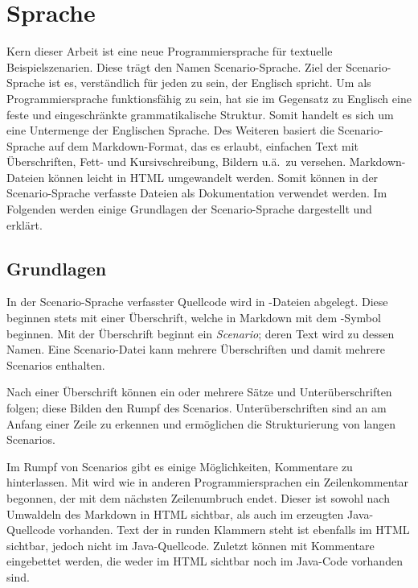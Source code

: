 \section{Sprache}\label{sec:language}

Kern dieser Arbeit ist eine neue Programmiersprache für textuelle Beispielszenarien.
Diese trägt den Namen Scenario-Sprache.
Ziel der Scenario-Sprache ist es, verständlich für jeden zu sein, der Englisch spricht.
Um als Programmiersprache funktionsfähig zu sein, hat sie im Gegensatz zu Englisch eine feste und eingeschränkte grammatikalische Struktur.
Somit handelt es sich um eine Untermenge der Englischen Sprache.
Des Weiteren basiert die Scenario-Sprache auf dem Markdown-Format,
das es erlaubt, einfachen Text mit Überschriften, Fett- und Kursivschreibung, Bildern u.ä.\ zu versehen.
Markdown-Dateien können leicht in HTML umgewandelt werden.
Somit können in der Scenario-Sprache verfasste Dateien als Dokumentation verwendet werden.
Im Folgenden werden einige Grundlagen der Scenario-Sprache dargestellt und erklärt.

\subsection{Grundlagen}\label{subsec:basics}

In der Scenario-Sprache verfasster Quellcode wird in -Dateien abgelegt.
Diese beginnen stets mit einer Überschrift, welche in Markdown mit dem \mdcode{#}-Symbol beginnen.
Mit der Überschrift beginnt ein \emph{Scenario};
deren Text wird zu dessen Namen.
Eine Scenario-Datei kann mehrere Überschriften und damit mehrere Scenarios enthalten.

Nach einer Überschrift können ein oder mehrere Sätze und Unterüberschriften folgen;
diese Bilden den Rumpf des Scenarios.
Unterüberschriften sind an \mdcode{##} am Anfang einer Zeile zu erkennen und ermöglichen die Strukturierung von langen Scenarios.

Im Rumpf von Scenarios gibt es einige Möglichkeiten, Kommentare zu hinterlassen.
Mit \jcode{//} wird wie in anderen Programmiersprachen ein Zeilenkommentar begonnen,
der mit dem nächsten Zeilenumbruch endet.
Dieser ist sowohl nach Umwaldeln des Markdown in HTML sichtbar,
als auch im erzeugten Java-Quellcode vorhanden.
Text der in runden Klammern  steht ist ebenfalls im HTML sichtbar,
jedoch nicht im Java-Quellcode.
Zuletzt können mit  Kommentare eingebettet werden,
die weder im HTML sichtbar noch im Java-Code vorhanden sind.

